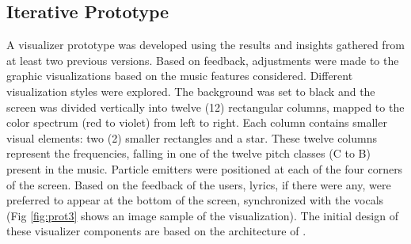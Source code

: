\documentclass{sigchi-ext}
\begin{document}



\subsection{Iterative Prototype}
A visualizer prototype was developed using the results and insights gathered from at least two previous versions. Based on feedback, adjustments were made to the graphic visualizations based on the music features considered. Different visualization styles were explored. The background was set to black and the screen was divided vertically into twelve (12) rectangular columns, mapped to the color spectrum (red to violet) from left to right. Each column contains smaller visual elements: two (2) smaller rectangles and a star. These twelve columns represent the frequencies, falling in one of the twelve pitch classes (C to B) present in the music. Particle emitters were positioned at each of the four corners of the screen. Based on the feedback of the users,  lyrics, if there were any, were preferred to appear at the bottom of the screen, synchronized with the vocals  (Fig \ref{fig:prot3} shows an image sample of the visualization). The  initial design of these visualizer components are based on the architecture of \cite{Nanayakkara:2007}.
\end{document}
